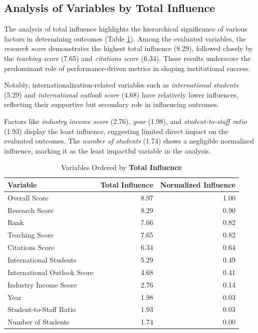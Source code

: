 \documentclass[conference]{IEEEtran}
\begin{document}
\subsection{Analysis of Variables by Total Influence}

The analysis of total influence highlights the hierarchical significance of various factors in determining outcomes (Table \ref{tab:total_influence}). Among the evaluated variables, the \textit{research score} demonstrates the highest total influence (8.29), followed closely by the \textit{teaching score} (7.65) and \textit{citations score} (6.34). These results underscore the predominant role of performance-driven metrics in shaping institutional success. 

Notably, internationalization-related variables such as \textit{international students} (5.29) and \textit{international outlook score} (4.68) have relatively lower influences, reflecting their supportive but secondary role in influencing outcomes.

Factors like \textit{industry income score} (2.76), \textit{year} (1.98), and \textit{student-to-staff ratio} (1.93) display the least influence, suggesting limited direct impact on the evaluated outcomes. The \textit{number of students} (1.74) shows a negligible normalized influence, marking it as the least impactful variable in the analysis.

\begin{table}[h!]
	\centering
	\caption{Variables Ordered by \textbf{Total Influence}}
	\label{tab:total_influence}
	\begin{tabular}{|l|r|r|}
		\hline
		\textbf{Variable} & \textbf{Total Influence} & \textbf{Normalized Influence} \\
		\hline
		Overall Score & 8.97 & 1.00 \\
		Research Score & 8.29 & 0.90 \\
		Rank & 7.66 & 0.82 \\
		Teaching Score & 7.65 & 0.82 \\
		Citations Score & 6.34 & 0.64 \\
		International Students & 5.29 & 0.49 \\
		International Outlook Score & 4.68 & 0.41 \\
		Industry Income Score & 2.76 & 0.14 \\
		Year & 1.98 & 0.03 \\
		Student-to-Staff Ratio & 1.93 & 0.03 \\
		Number of Students & 1.74 & 0.00 \\
		\hline
	\end{tabular}
\end{table}
\end{document}

